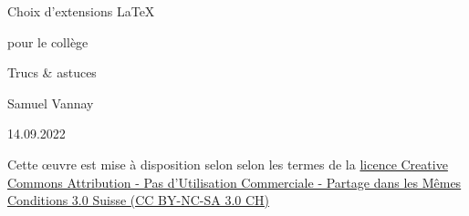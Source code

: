 
\begin{titlepage}
	\begin{center}
		\vspace*{3cm}
		
		\Huge{
			Choix d'extensions \LaTeX
			
			pour le collège
		}

		\vspace*{3cm}
		
		\Huge{
			Trucs \& astuces
		}
		
		\vspace{12cm}
		
		\small{
			Samuel Vannay
			
			14.09.2022
			
			\ccLogo \ccAttribution \ccNonCommercialEU \ccShareAlike
		}
	\end{center}

\end{titlepage}
 






\tableofcontents

\vfill

Cette {\oe}uvre est mise à disposition selon selon les termes de la \href{http://creativecommons.org/licenses/by-nc-sa/3.0/ch/deed.fr}{licence Creative Commons Attribution - Pas d'Utilisation Commerciale - Partage dans les Mêmes Conditions 3.0 Suisse (CC BY-NC-SA 3.0 CH)}